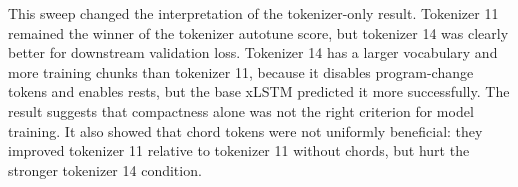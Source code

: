 \begin{table}[htbp]
	\centering
	\scriptsize
	\caption{Tokenizer conditions evaluated as downstream xLSTM training conditions.}
	\label{tab:xlstm_runs}
\end{table}

This sweep changed the interpretation of the tokenizer-only result. Tokenizer 11 remained the winner of the tokenizer autotune score, but tokenizer 14 was clearly better for downstream validation loss. Tokenizer 14 has a larger vocabulary and more training chunks than tokenizer 11, because it disables program-change tokens and enables rests, but the base xLSTM predicted it more successfully. The result suggests that compactness alone was not the right criterion for model training. It also showed that chord tokens were not uniformly beneficial: they improved tokenizer 11 relative to tokenizer 11 without chords, but hurt the stronger tokenizer 14 condition.

